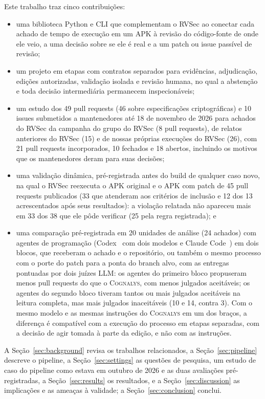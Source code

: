 \documentclass[conference]{IEEEtran}
\newcommand{\system}{\textsc{Cognalys}}
\begin{document}
Este trabalho traz cinco contribuições:
\begin{itemize}
  \item uma biblioteca Python e CLI que complementam o RVSec ao conectar cada
  achado de tempo de execução em um APK à revisão do código-fonte de onde ele veio, a uma decisão
  sobre se ele é real e a um patch ou issue passível de revisão;
  \item um projeto em etapas com contratos separados para evidências, adjudicação,
  edições autorizadas, validação isolada e revisão humana, no qual a abstenção
  e toda decisão intermediária permanecem inspecionáveis;
  \item um estudo dos 49 pull requests (46 sobre especificações criptográficas)
  e 10 issues submetidos a mantenedores até 18 de novembro de 2026 para achados
  do RVSec da campanha do grupo do RVSec (8 pull requests), de relatos anteriores
  do RVSec (15) e de nossas próprias execuções do RVSec (26), com 21 pull requests
  incorporados, 10 fechados e 18 abertos, incluindo os motivos que os mantenedores
  deram para suas decisões;
  \item uma validação dinâmica, pré-registrada antes do build de qualquer caso novo, na
  qual o RVSec reexecuta o APK original e o APK com patch de 45 pull requests
  publicados (33 que atenderam aos critérios de inclusão e 12 dos 13 acrescentados
  após seus resultados): a violação relatada não apareceu mais em 33 dos 38 que ele
  pôde verificar (25 pela regra registrada); e
  \item uma comparação pré-registrada em 20 unidades de análise (24 achados) com
  agentes de programação (Codex~\cite{openai2026codex}
  com dois modelos e Claude Code~\cite{anthropic2026claudecode}) em dois blocos, que receberam o achado e o
  repositório, ou também o mesmo processo com o porte do patch para a ponta do
  branch alvo, com as entregas pontuadas por dois juízes LLM: os agentes do primeiro
  bloco propuseram menos pull requests do que o \system{}, com menos julgados aceitáveis;
  os agentes do segundo bloco tiveram tantos ou mais julgados aceitáveis na leitura
  completa, mas mais julgados inaceitáveis (10 e 14, contra 3). Com o mesmo modelo e as mesmas
  instruções do \system{} em um dos braços, a diferença é compatível com a
  execução do processo em etapas separadas, com a decisão de agir tomada à parte
  da edição, e não com as instruções.
\end{itemize}

A Seção~\ref{sec:background} revisa os trabalhos relacionados,
a Seção~\ref{sec:pipeline} descreve o pipeline, a Seção~\ref{sec:settings}
as questões de pesquisa, um estudo de caso do pipeline como estava em outubro
de 2026 e as duas avaliações pré-registradas, a Seção~\ref{sec:results} os
resultados, e a Seção~\ref{sec:discussion} as implicações e as ameaças à
validade; a Seção~\ref{sec:conclusion} conclui.
\end{document}
